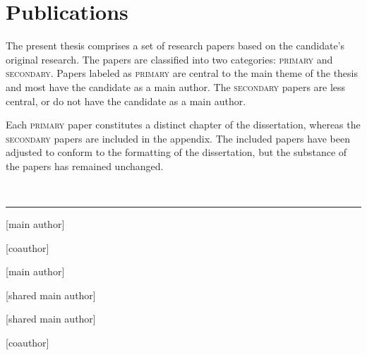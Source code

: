 
\chapter[publications]{Publications}

The present thesis comprises a set of research papers based on the candidate's original research. The papers are classified into two categories: \textsc{primary} and \textsc{secondary}. 
Papers labeled as \textsc{primary} are central to the main theme of the thesis and most have the candidate as a main author. The \textsc{secondary} papers are less central, or do not have the candidate as a main author.


\noindent Each \textsc{primary} paper constitutes a distinct chapter of the dissertation, whereas the \textsc{secondary} papers are included in the appendix. The included papers have been adjusted to conform to the formatting of the dissertation, but the substance of the papers has remained unchanged.


\vspace{5mm}

\raggedright\par\noindent\hspace{8mm}{\Large\scshape primary}\\[-2mm]

\raggedleft\rule{\textwidth - 8mm}{0.4pt}

\begin{enumerate}[leftmargin=8mm,topsep=0mm,label={[\Alph*]}]
    \item {} [main author]
    \item {} [coauthor]
    \item {} [main author]
    \item {} [shared main author]
    \item {} [shared main author]
    \item {} [coauthor]
\end{enumerate}

\vspace{5mm}

